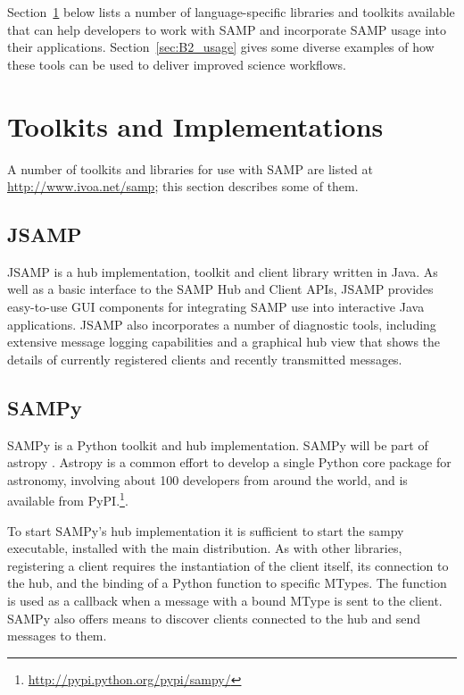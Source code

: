 Section~\ref{sec:B2_libs} below lists a number of language-specific
libraries and toolkits available that can help developers to work
with SAMP and incorporate SAMP usage into their applications.
Section~\ref{sec:B2_usage} gives some diverse examples of
how these tools can be used to deliver improved science workflows.

\section{Toolkits and Implementations}
\label{sec:B2_libs}

A number of toolkits and libraries for use with SAMP are listed at
\url{http://www.ivoa.net/samp}; this section describes some of them.

\subsection{JSAMP}

JSAMP is a hub implementation, toolkit and client library written in Java.
As well as a
basic interface to the SAMP Hub and Client APIs,
JSAMP provides easy-to-use GUI components
for integrating SAMP use into interactive Java applications.
JSAMP also incorporates a number of diagnostic tools,
including extensive message logging capabilities and
a graphical hub view that shows the details of currently registered
clients and recently transmitted messages.

\subsection{SAMPy}

SAMPy is a Python toolkit and hub implementation.
SAMPy will be part of 
astropy \citep{O30_adassxxii}. Astropy is
a common effort to develop a single Python core
package for astronomy, involving about 100 developers from around the world,
and is available from PyPI.\footnote{\url{http://pypi.python.org/pypi/sampy/}}.

To start SAMPy's hub implementation it is sufficient to start the sampy
executable, installed with the main distribution. As with other libraries,
registering a client requires the instantiation of the client itself, its
connection to the hub, and the binding of a Python function to specific
MTypes. The function is used as a callback when a message with a bound
MType is sent to the client. SAMPy also offers means to discover clients
connected to the hub and send messages to them.

